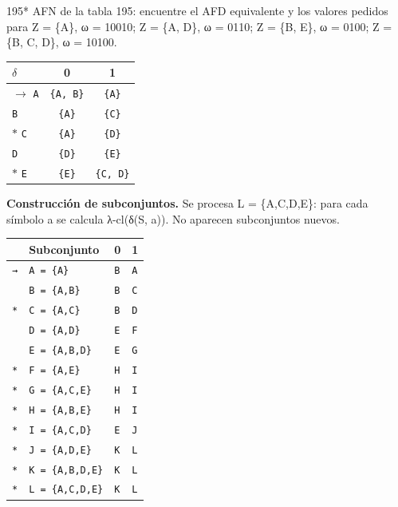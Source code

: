 \documentclass[11pt]{article}
\begin{document}
\begin{ejercicio}{195}{*}
AFN de la tabla 195: encuentre el AFD equivalente y los valores pedidos para Z = \{A\}, ω = 10010; Z = \{A, D\}, ω = 0110; Z = \{B, E\}, ω = 0100; Z = \{B, C, D\}, ω = 10100.
\end{ejercicio}
\proc \begin{center}\small\begin{tabular}{lcc}\toprule
$\delta$ & 0 & 1 \\\midrule
$\to$ \texttt{A} & \texttt{\{A, B\}} & \texttt{\{A\}} \\
 \texttt{B} & \texttt{\{A\}} & \texttt{\{C\}} \\
$*$ \texttt{C} & \texttt{\{A\}} & \texttt{\{D\}} \\
 \texttt{D} & \texttt{\{D\}} & \texttt{\{E\}} \\
$*$ \texttt{E} & \texttt{\{E\}} & \texttt{\{C, D\}} \\
\bottomrule\end{tabular}\end{center}
\textbf{Construcción de subconjuntos.} Se procesa L = \{A,C,D,E\}: para cada símbolo a se calcula λ-cl(δ(S, a)). No aparecen subconjuntos nuevos.
\begin{center}\footnotesize\begin{tabular}{llll}\toprule
 & Subconjunto & 0 & 1 \\\midrule
\texttt{→} & \texttt{A = \{A\}} & \texttt{B} & \texttt{A} \\
\texttt{} & \texttt{B = \{A,B\}} & \texttt{B} & \texttt{C} \\
\texttt{*} & \texttt{C = \{A,C\}} & \texttt{B} & \texttt{D} \\
\texttt{} & \texttt{D = \{A,D\}} & \texttt{E} & \texttt{F} \\
\texttt{} & \texttt{E = \{A,B,D\}} & \texttt{E} & \texttt{G} \\
\texttt{*} & \texttt{F = \{A,E\}} & \texttt{H} & \texttt{I} \\
\texttt{*} & \texttt{G = \{A,C,E\}} & \texttt{H} & \texttt{I} \\
\texttt{*} & \texttt{H = \{A,B,E\}} & \texttt{H} & \texttt{I} \\
\texttt{*} & \texttt{I = \{A,C,D\}} & \texttt{E} & \texttt{J} \\
\texttt{*} & \texttt{J = \{A,D,E\}} & \texttt{K} & \texttt{L} \\
\texttt{*} & \texttt{K = \{A,B,D,E\}} & \texttt{K} & \texttt{L} \\
\texttt{*} & \texttt{L = \{A,C,D,E\}} & \texttt{K} & \texttt{L} \\
\bottomrule\end{tabular}\end{center}
\end{document}
